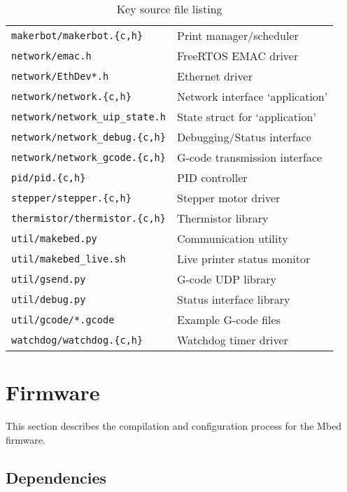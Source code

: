 \begin{table}
\begin{tabular}{p{} p{}}
				\addlinespace
				\verb|makerbot/makerbot.{c,h}| & Print manager/scheduler \\
				\addlinespace
				\verb|network/emac.h| & FreeRTOS EMAC driver \\
				\verb|network/EthDev*.h| & Ethernet driver \\
				\verb|network/network.{c,h}| & Network interface \uIP{} `application' \\
				\verb|network/network_uip_state.h| & State struct for \uIP{} `application' \\
				\verb|network/network_debug.{c,h}| & Debugging/Status interface \\
				\verb|network/network_gcode.{c,h}| & G-code transmission interface \\
				\addlinespace
				\verb|pid/pid.{c,h}| & PID controller \\
				\addlinespace
				\verb|stepper/stepper.{c,h}| & Stepper motor driver \\
				\addlinespace
				\verb|thermistor/thermistor.{c,h}| & Thermistor library \\
				\addlinespace
				\verb|util/makebed.py| & Communication utility \\
				\verb|util/makebed_live.sh| & Live printer status monitor\\
				\verb|util/gsend.py| & G-code UDP library \\
				\verb|util/debug.py| & Status interface library \\
				\verb|util/gcode/*.gcode| & Example G-code files \\
				\addlinespace
				\verb|watchdog/watchdog.{c,h}| & Watchdog timer driver \\
				\bottomrule
			\end{tabular}
			
			\caption{Key source file listing}
			\label{tab:files}
		\end{table}
	
	\section{Firmware}
		
		This section describes the compilation and configuration process for the
		Mbed firmware.
		
		\subsection{Dependencies}
			
